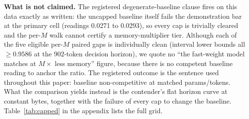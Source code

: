 \textbf{What is not claimed.} The registered degenerate-baseline clause
fires on this data exactly as written: the uncapped baseline itself fails
the demonstration bar at the primary cell (readings 0.0271 to 0.0293),
so every cap is trivially cleared and the per-$M$ walk cannot certify a
memory-multiplier tier. Although each of the five eligible per-$M$ paired
gaps is individually clean (interval lower bounds all $\geq 0.9586$ at the
902-token decision horizon), %
we quote no ``the fast-weight model matches at $M\times$ less memory''
figure, because there is no competent baseline reading to anchor the
ratio. The registered outcome is the sentence used throughout this paper:
baseline non-competitive at matched params/tokens. What the comparison
yields instead is the contender's flat horizon curve at constant bytes,
together with the failure of every cap to change the baseline.
Table~\ref{tab:capped} in the appendix lists the full grid.
